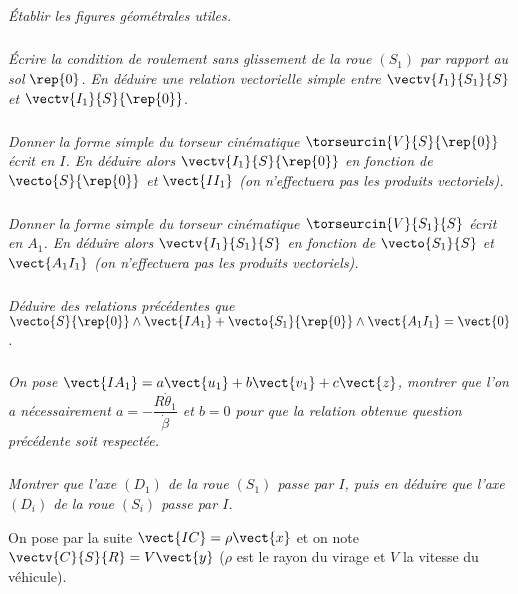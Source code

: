 \begin{multicols}{2}
\subparagraph{}
\textit{Établir les figures géométrales utiles.}
\ifprof%
\begin{corrige}
\end{corrige}\else\fi

\subparagraph{}
\textit{Écrire la condition de roulement sans glissement de la roue $(S_1)$ par rapport au sol $\rep{0}$. En déduire une relation vectorielle simple entre $\vectv{I_1}{S_1}{S}$ et $\vectv{I_1}{S}{\rep{0}}$.}
\ifprof%
\begin{corrige}
\end{corrige}\else\fi

\subparagraph{}
\textit{Donner la forme simple du torseur cinématique $\torseurcin{V}{S}{\rep{0}}$ écrit en $I$. En déduire alors $\vectv{I_1}{S}{\rep{0}}$ en fonction de $\vecto{S}{\rep{0}}$ et $\vect{II_1}$ (on n'effectuera pas les produits vectoriels).}
\ifprof%
\begin{corrige}
\end{corrige}\else\fi
\subparagraph{}
\textit{Donner la forme simple du torseur cinématique $\torseurcin{V}{S_1}{S}$ écrit en $A_1$. En déduire alors $\vectv{I_1}{S_1}{S}$ en fonction de $\vecto{S_1}{S}$ et $\vect{A_1 I_1}$ (on n'effectuera pas les produits vectoriels).}
\ifprof%
\begin{corrige}
\end{corrige}\else\fi
\subparagraph{}
\textit{Déduire des relations précédentes que $\vecto{S}{\rep{0}}\wedge \vect{IA_1} + \vecto{S_1}{\rep{0}}\wedge \vect{A_1I_1}=\vect{0}$.}
\ifprof%
\begin{corrige}
\end{corrige}\else\fi
\subparagraph{}
\textit{On pose $\vect{IA_1}=a\vect{u_1}+b\vect{v_1}+c\vect{z}$, montrer que l'on a nécessairement $a=-\dfrac{R\dot{\theta}_1}{\dot{\beta}}$ et $b = 0$ pour que la relation obtenue question précédente soit respectée. }
\ifprof%
\begin{corrige}
\end{corrige}\else\fi
\subparagraph{}
\textit{ Montrer que l'axe $(D_1)$ de la roue $(S_1)$ passe par $I$,  puis en déduire que l'axe $(D_i )$ de la roue $(S_i )$ passe par $I$.}
\ifprof%
\begin{corrige}
\end{corrige}\else\fi


  On pose par la suite $\vect{IC}=\rho \vect{x}$ et on note $\vectv{C}{S}{R} =V\vect{y}$ ($\rho$ est le rayon du virage et $V$ la vitesse du véhicule).
  

\end{multicols}

